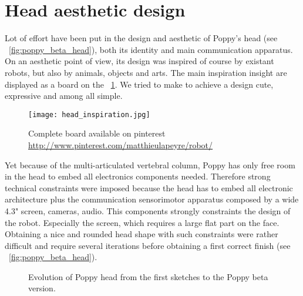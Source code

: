 

\section{Head aesthetic design} %

Lot of effort have been put in the design and aesthetic of Poppy's head (see \figurename~\ref{fig:poppy_beta_head}), both its identity and main communication apparatus.
On an aesthetic point of view, its design was inspired of course by existant robots, but also by animals, objects and arts. The main inspiration insight are displayed as a board on the \figurename~\ref{fig:head_inspiration}. We tried to make to achieve a design cute, expressive and among all simple.

\begin{figure}[p]
    \begin{center}
        \texttt{[image: head\_inspiration.jpg]}
    \end{center}
    \caption{Complete board available on pinterest \url{http://www.pinterest.com/matthieulapeyre/robot/}}
    \label{fig:head_inspiration}
\end{figure}

Yet because of the multi-articulated vertebral column, Poppy has only free room in the head to embed all electronics components needed. Therefore strong technical constraints were imposed because the head has to embed all electronic architecture plus the communication sensorimotor apparatus composed by a wide 4.3" screen, cameras, audio.
This components strongly constraints the design of the robot. Especially the screen, which requires a large flat part on the face. Obtaining a nice and rounded head shape with such constraints were rather difficult and require several iterations before obtaining a first correct finish (see \figurename~\ref{fig:poppy_beta_head}).


\begin{figure}[p]
\centering
    \hfil
    \newline
    \hfil
    \newline
    \hfil
    \caption{Evolution of Poppy head from the first sketches to the Poppy beta version.}
    \label{fig:head_sketch}
\end{figure}



